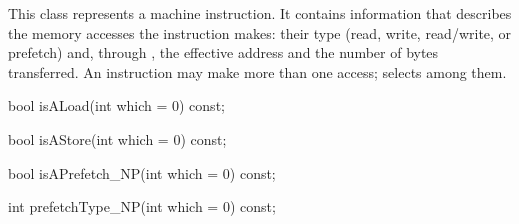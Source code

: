 
This class represents a machine instruction. It contains information
that describes the memory accesses the instruction makes: their type
(read, write, read/write, or prefetch) and, through
, the effective address and the number of
bytes transferred. An instruction may make more than one access;
 selects among them.

\begin{apient}
  bool isALoad(int which = 0) const;
\end{apient}


\begin{apient}
  bool isAStore(int which = 0) const;
\end{apient}


\begin{apient}
  bool isAPrefetch_NP(int which = 0) const;
\end{apient}


\begin{apient}
  int prefetchType_NP(int which = 0) const;
\end{apient}


